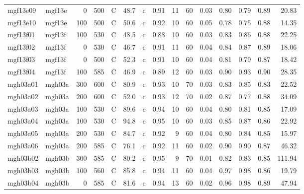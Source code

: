 \documentclass{article}
\begin{document}
\begin{landscape}
\begin{longtable}{llrrlrlrrrrrrrr}
    mgf13e09 &     mgf13e &    0 &  500 &     C &    48.7 &   c &  0.91 &  11 &         60 &  0.03 &  0.80 &  0.79 &  0.89 &   20.83 \\
    mgf13e10 &     mgf13e &  100 &  500 &     C &    50.6 &   c &  0.92 &  10 &         60 &  0.05 &  0.78 &  0.75 &  0.88 &   14.35 \\
    mgf13f01 &     mgf13f &  100 &  530 &     C &    48.5 &   c &  0.88 &  10 &         60 &  0.03 &  0.83 &  0.86 &  0.88 &   22.25 \\
    mgf13f02 &     mgf13f &    0 &  530 &     C &    46.7 &   c &  0.91 &  11 &         60 &  0.04 &  0.84 &  0.87 &  0.89 &   18.06 \\
    mgf13f03 &     mgf13f &    0 &  500 &     C &    52.3 &   c &  0.91 &  10 &         60 &  0.04 &  0.81 &  0.79 &  0.87 &   18.42 \\
    mgf13f04 &     mgf13f &  100 &  585 &     C &    46.9 &   c &  0.89 &  12 &         60 &  0.03 &  0.90 &  0.93 &  0.90 &   28.35 \\
    mgh03a01 &     mgh03a &  300 &  600 &     C &    80.9 &   c &  0.93 &  10 &         70 &  0.03 &  0.83 &  0.85 &  0.83 &   22.52 \\
    mgh03a02 &     mgh03a &  200 &  600 &     C &    52.0 &   c &  0.93 &  12 &         70 &  0.02 &  0.87 &  0.77 &  0.88 &   34.09 \\
    mgh03a03 &     mgh03a &  100 &  530 &     C &    89.6 &   c &  0.94 &  10 &         60 &  0.04 &  0.80 &  0.81 &  0.85 &   17.09 \\
    mgh03a04 &     mgh03a &  100 &  530 &     C &    94.8 &   c &  0.95 &  10 &         60 &  0.03 &  0.85 &  0.87 &  0.86 &   22.92 \\
    mgh03a05 &     mgh03a &  200 &  530 &     C &    84.7 &   c &  0.92 &   9 &         60 &  0.04 &  0.80 &  0.84 &  0.85 &   15.97 \\
    mgh03a06 &     mgh03a &  200 &  585 &     C &    76.1 &   c &  0.92 &  11 &         60 &  0.02 &  0.90 &  0.90 &  0.87 &   46.32 \\
    mgh03b02 &     mgh03b &  300 &  585 &     C &    80.2 &   c &  0.95 &   9 &         70 &  0.01 &  0.82 &  0.83 &  0.85 &  111.94 \\
    mgh03b03 &     mgh03b &  100 &  560 &     C &    85.8 &   c &  0.94 &  11 &         60 &  0.04 &  0.97 &  0.98 &  0.86 &   19.79 \\
    mgh03b04 &     mgh03b &    0 &  585 &     C &    81.6 &   c &  0.94 &  13 &         60 &  0.02 &  0.96 &  0.98 &  0.89 &   47.94 \\

\end{longtable}
\end{landscape}
\end{document}
